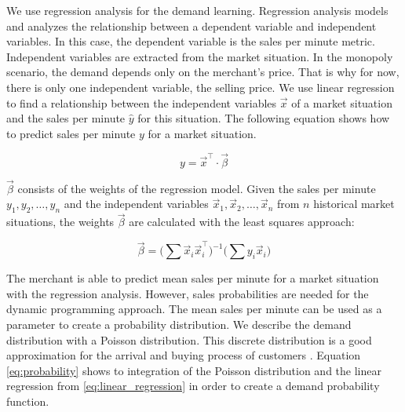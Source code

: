We use regression analysis for the demand learning.
Regression analysis models and analyzes the relationship between a dependent variable and independent variables.
In this case, the dependent variable is the sales per minute metric.
Independent variables are extracted from the market situation.
In the monopoly scenario, the demand depends only on the merchant's price.
That is why for now, there is only one independent variable, the selling price.
We use linear regression to find a relationship between the independent variables $\vec{x}$ of a market situation and the sales per minute $\hat{y}$ for this situation.
The following equation shows how to predict sales per minute $y$ for a market situation.

\begin{equation}
\label{eq:linear_regression}
y = \vec{x}^\intercal \cdot \vec{\beta}
\end{equation}

$\vec{\beta}$ consists of the weights of the regression model.
Given the sales per minute $y_1, y_2, \ldots, y_n$ and the independent variables $\vec{x}_1, \vec{x}_2, \ldots, \vec{x}_n$ from $n$ historical market situations, the weights $\vec{\beta}$ are calculated with the least squares approach:

\begin{equation}
\vec{\beta} = \Big(\sum{\vec{x}_i \vec{x}_i^\intercal} \Big)^{-1}
			  \Big(\sum{y_i \vec{x}_i} \Big)
\end{equation}

The merchant is able to predict mean sales per minute for a market situation with the regression analysis.
However, sales probabilities are needed for the dynamic programming approach.
The mean sales per minute can be used as a parameter to create a probability distribution.
We describe the demand distribution with a Poisson distribution.
This discrete distribution is a good approximation for the arrival and buying process of customers \cite{DBLP:journals/ior/Wolff82}.
Equation \ref{eq:probability} shows to integration of the Poisson distribution and the linear regression from \cref{eq:linear_regression} in order to create a demand probability function.

